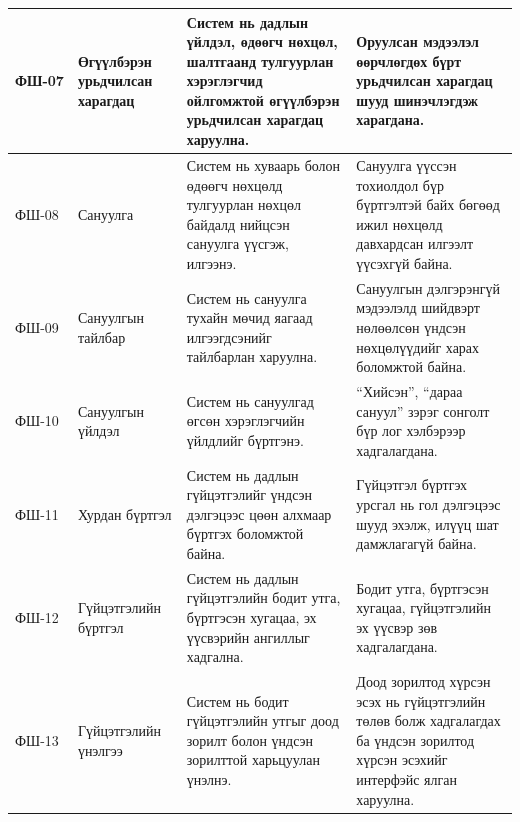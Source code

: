{\begin{longtable}{|L{1.3cm}|L{2.5cm}|L{5.4cm}|L{4.0cm}|}
\hline
ФШ-07 & Өгүүлбэрэн урьдчилсан харагдац & Систем нь дадлын үйлдэл, өдөөгч нөхцөл, шалтгаанд тулгуурлан хэрэглэгчид ойлгомжтой өгүүлбэрэн урьдчилсан харагдац харуулна. & Оруулсан мэдээлэл өөрчлөгдөх бүрт урьдчилсан харагдац шууд шинэчлэгдэж харагдана. \\
\hline
ФШ-08 & Сануулга & Систем нь хуваарь болон өдөөгч нөхцөлд тулгуурлан нөхцөл байдалд нийцсэн сануулга үүсгэж, илгээнэ. & Сануулга үүссэн тохиолдол бүр бүртгэлтэй байх бөгөөд ижил нөхцөлд давхардсан илгээлт үүсэхгүй байна. \\
\hline
ФШ-09 & Сануулгын тайлбар & Систем нь сануулга тухайн мөчид яагаад илгээгдсэнийг тайлбарлан харуулна. & Сануулгын дэлгэрэнгүй мэдээлэлд шийдвэрт нөлөөлсөн үндсэн нөхцөлүүдийг харах боломжтой байна. \\
\hline
ФШ-10 & Сануулгын үйлдэл & Систем нь сануулгад өгсөн хэрэглэгчийн үйлдлийг бүртгэнэ. & ``Хийсэн'', ``дараа сануул'' зэрэг сонголт бүр лог хэлбэрээр хадгалагдана. \\
\hline
ФШ-11 & Хурдан бүртгэл & Систем нь дадлын гүйцэтгэлийг үндсэн дэлгэцээс цөөн алхмаар бүртгэх боломжтой байна. & Гүйцэтгэл бүртгэх урсгал нь гол дэлгэцээс шууд эхэлж, илүүц шат дамжлагагүй байна. \\
\hline
ФШ-12 & Гүйцэтгэлийн бүртгэл & Систем нь дадлын гүйцэтгэлийн бодит утга, бүртгэсэн хугацаа, эх үүсвэрийн ангиллыг хадгална. & Бодит утга, бүртгэсэн хугацаа, гүйцэтгэлийн эх үүсвэр зөв хадгалагдана. \\
\hline
ФШ-13 & Гүйцэтгэлийн үнэлгээ & Систем нь бодит гүйцэтгэлийн утгыг доод зорилт болон үндсэн зорилттой харьцуулан үнэлнэ. & Доод зорилтод хүрсэн эсэх нь гүйцэтгэлийн төлөв болж хадгалагдах ба үндсэн зорилтод хүрсэн эсэхийг интерфэйс ялган харуулна. \\
\hline
\end{longtable}
}

